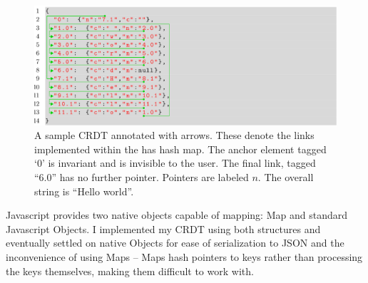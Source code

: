 \documentclass[12pt,a4paper,twoside,openright]{report}
\begin{document}
		
		


	\begin{figure}[H]
		\centering
		\includegraphics[width=1\linewidth]{figs/hash_list.eps}
		\caption[Annotated CRDT]{A sample CRDT annotated with arrows. These denote the links implemented within the has hash map. The anchor element tagged `0' is invariant and is invisible to the user. The final link, tagged ``6.0'' has no further pointer. Pointers are labeled $n$. The overall string is ``Hello world''.}
		\label{fig:hashlist}
		\end{figure}
		
		Javascript provides two native objects capable of mapping: Map and standard Javascript Objects. I implemented my CRDT using both structures and eventually settled on native Objects for ease of serialization to JSON and the inconvenience of using Maps -- Maps hash pointers to keys rather than processing the keys themselves, making them difficult to work with.
		
\end{document}

